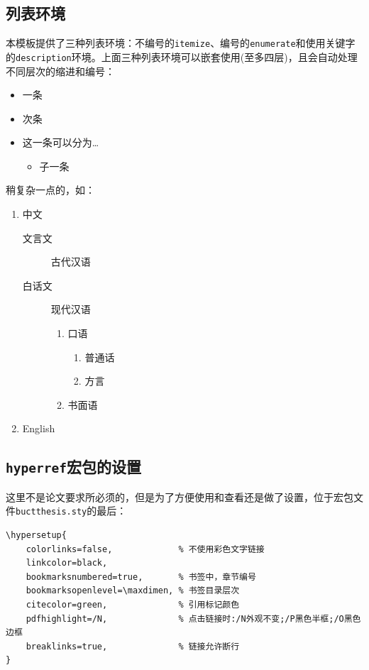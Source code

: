     \subsection{列表环境}
    本模板提供了三种列表环境：不编号的\texttt{itemize}、编号的\texttt{enumerate}和使用关键字的\texttt{description}环境。上面三种列表环境可以嵌套使用(至多四层)，且会自动处理不同层次的缩进和编号：
    \begin{itemize}
        \item 一条
        \item 次条
        \item 这一条可以分为\dots
            \begin{itemize}
            \item 子一条
            \end{itemize}
        \end{itemize}
    稍复杂一点的，如：
        \begin{enumerate}
            \item 中文
            \begin{description}
                \item[文言文] 古代汉语
                \item[白话文] 现代汉语
                \begin{enumerate}
                    \item 口语
                        \begin{enumerate}
                            \item 普通话
                            \item 方言
                        \end{enumerate}
                    \item 书面语
                    \end{enumerate}
            \end{description}
            \item English
        \end{enumerate}
    \subsection{\texttt{hyperref}宏包的设置}
    这里不是论文要求所必须的，但是为了方便使用和查看还是做了设置，位于宏包文件\texttt{buctthesis.sty}的最后：
    \begin{lstlisting}[firstnumber=388]
\hypersetup{
    colorlinks=false,             % 不使用彩色文字链接
    linkcolor=black,
    bookmarksnumbered=true,       % 书签中，章节编号
    bookmarksopenlevel=\maxdimen, % 书签目录层次
    citecolor=green,              % 引用标记颜色
    pdfhighlight=/N,              % 点击链接时:/N外观不变;/P黑色半框;/O黑色边框
    breaklinks=true,              % 链接允许断行
}
    \end{lstlisting}
